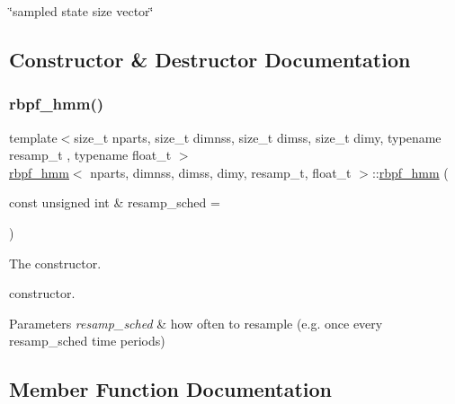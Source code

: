 \char`\"{}sampled state size vector\char`\"{} 

\subsection{Constructor \& Destructor Documentation}
\mbox{\label{classrbpf__hmm_a39295fbe6066714572219c4544ba2940}} 
\subsubsection{\texorpdfstring{rbpf\+\_\+hmm()}{rbpf\_hmm()}}
{\footnotesize\ttfamily template$<$size\+\_\+t nparts, size\+\_\+t dimnss, size\+\_\+t dimss, size\+\_\+t dimy, typename resamp\+\_\+t , typename float\+\_\+t $>$ \\
\hyperlink{classrbpf__hmm}{rbpf\+\_\+hmm}$<$ nparts, dimnss, dimss, dimy, resamp\+\_\+t, float\+\_\+t $>$\+::\hyperlink{classrbpf__hmm}{rbpf\+\_\+hmm} (\begin{DoxyParamCaption}\item[{const unsigned int \&}]{resamp\+\_\+sched = {} }\end{DoxyParamCaption})}



The constructor. 

constructor. 
\begin{DoxyParams}{Parameters}
{\em resamp\+\_\+sched} & how often to resample (e.\+g. once every resamp\+\_\+sched time periods) \\
\hline
\end{DoxyParams}


\subsection{Member Function Documentation}
\mbox{\label{classrbpf__hmm_a74864b32274b746d281295c293a28cdd}} 
